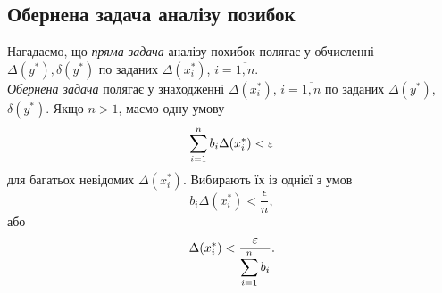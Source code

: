 \subsection{Обернена задача аналізу позибок}

Нагадаємо, що \textit{пряма задача} аналізу похибок полягає у обчисленні $\Delta (y^*), \delta (y^*)$ по заданих $\Delta (x_i^*)$, $i = \overline{1, n}$. \\

\textit{Обернена задача} полягає у знаходженні $\Delta (x_i^*)$, $i = \overline{1, n}$ по заданих $\Delta (y^*)$, $\delta (y^*)$. Якщо $n > 1$, маємо одну умову 
\begin{equation}
	\label{eq:1.21}
	\displaystyle\sum\limits_{i=1}^n b_i \Delta (x_i^*) < \varepsilon
\end{equation}
для багатьох невідомих $\Delta (x_i^*)$. Вибирають їх із однієї з умов 
\begin{equation}
	\label{eq:1.22}
	b_i \Delta (x_i^*) < \dfrac{\epsilon}{n},
\end{equation}
або
\begin{equation}
	\label{eq:1.23}
	\Delta (x_i^*) < \dfrac{\varepsilon}{\displaystyle\sum\limits_{i=1}^n b_i}.
\end{equation}